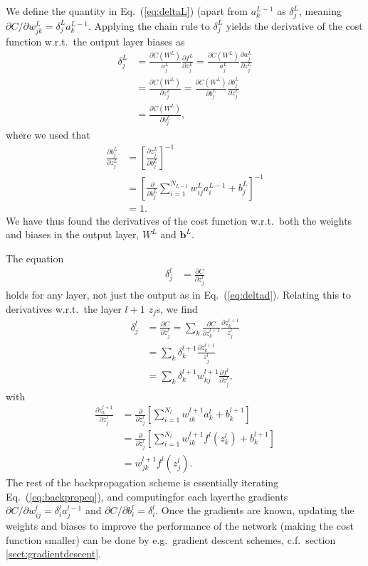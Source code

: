 \documentclass[a4paper, twocolumn]{article}
\newcommand{\eq} [1]{Eq.\ (\ref{eq:#1})}
\begin{document}
We define the quantity in \eq{deltaL} (apart from $a_k^{L-1}$ as $\delta_j^L$, meaning $\partial C/\partial w_{jk}^L=\delta^L_ja_k^{L-1}$. Applying the chain rule to $\delta^L_j$ yields the derivative of the cost function w.r.t.\ the output layer biases as
\begin{align}
\delta^L_j&= \frac{\partial C(W^L)}{a_j^L}\frac{\partial f^L}{\partial z_j^L} = \frac{\partial C(W^L)}{a_j^L}\frac{\partial a_j^L}{\partial z_j^L} \nonumber \\
%
&= \frac{\partial C(W^L)}{\partial z_j^L} = \frac{\partial C(W^L)}{\partial b_j^L} \frac{\partial b_j^L}{\partial z_j^L} \label{eq:deltad} \\
&= \frac{\partial C(W^L)}{\partial b_j^L},
\end{align}
where we used that 
\begin{align}
\frac{\partial b_j^L}{\partial z_j^L} &= \left[\frac{\partial z_j^L}{\partial b_j^L}\right]^{-1} \nonumber \\
%
&= \left[\frac{\partial}{\partial b_j^L} \sum_{i=1}^{N_{L-1}} w_{ij}^L a_i^{L-1}+b_j^L \right]^{-1} \nonumber \\
%
&= 1.
\end{align}
We have thus found the derivatives of the cost function w.r.t.\ both the weights and biases in the output layer, $W^L$ and $\mathbf{b}^L$. 

The equation 
\begin{align}
\delta_j^l &= \frac{\partial C}{\partial z_j^l}
\end{align}
holds for any layer, not just the output as in \eq{deltad}. Relating this to derivatives w.r.t.\ the layer $l+1$ $z_j$s, we find
\begin{align}
\delta_j^l &= \frac{\partial C}{\partial z_j^l} = \sum_k\frac{\partial C}{\partial z_k^{l+1}} \frac{\partial z_k^{l+1}}{z_j^l} \nonumber \\
&= \sum_k \delta_k^{l+1}\frac{\partial z_k^{l+1}}{z_j^l} \nonumber \\
%
&= \sum_k \delta_k^{l+1}w_{kj}^{l+1}\frac{\partial f^l}{\partial z_j^l}, \label{eq:backpropeq}
\end{align}
with 
\begin{align}
\frac{\partial z_k^{l+1}}{\partial z_j^l} &= \frac{\partial}{\partial z_j^l}\left[\sum_{i=1}^{N_l}w_{ik}^{l+1}a_k^l + b_k^{l+1}\right] \nonumber \\
%
&= \frac{\partial}{\partial z_j^l}\left[\sum_{i=1}^{N_l}w_{ik}^{l+1}f^l(z_k^l) + b_k^{l+1}\right] \nonumber \\
&= w_{jk}^{l+1}f^l(z_j^l).
\end{align}
The rest of the backpropagation scheme is essentially iterating \eq{backpropeq}, and computing\textemdash for each layer\textemdash the gradients $\partial C/\partial w_{ij}^l=\delta_i^la_j^{l-1}$ and $\partial C/\partial b_i^l=\delta_i^l$. Once the gradients are known, updating the weights and biases to improve the performance of the network (making the cost function smaller) can be done by e.g.\ gradient descent schemes, c.f.\ section \ref{sect:gradientdescent}.
\end{document}
